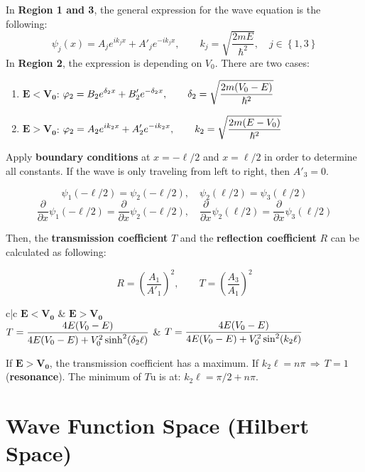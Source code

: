 \documentclass{article}
\begin{document}
\begin{twocolumn}
In \textbf{Region 1 and 3}, the general expression for the wave equation is the following:
$$\psi_j(x) = A_j e^{i k_j x} + A'_j e^{-i k_j x}, \qquad k_j = \sqrt{\frac{2mE}{\hslash^2}}, \quad j \in \left\{ 1, 3 \right\}$$
In \textbf{Region 2}, the expression is depending on $V_0$. There are two cases:
\begin{enumerate}
	\item $\mathbf{E < V_0}$: $\displaystyle \varphi_2 = B_2 e^{\delta_2 x} + B'_2 e^{- \delta_2 x}, \qquad \delta_2 = \sqrt{\frac{2m(V_0 - E)}{\hslash^2}}$
	\item $\mathbf{E > V_0}$: $\displaystyle \varphi_2 = A_2 e^{i k_2 x} + A'_2 e^{-i k_2 x}, \qquad k_2 = \sqrt{\frac{2m(E - V_0)}{\hslash^2}}$
\end{enumerate}
Apply \textbf{boundary conditions} at $x = -\ell/2$ and $x = \ell/2$ in order to determine all constants. If the wave is only traveling from left to right, then $A'_3 = 0$.

$$\psi_1(-\ell/2) = \psi_2(-\ell/2), \quad \psi_2(\ell/2) = \psi_3(\ell/2)$$
$$\frac{\partial}{\partial x}\psi_1(-\ell/2) = \frac{\partial}{\partial x}\psi_2(-\ell/2), \quad \frac{\partial}{\partial x}\psi_2(\ell/2) = \frac{\partial}{\partial x}\psi_3(\ell/2)$$

Then, the \textbf{transmission coefficient} $T$ and the \textbf{reflection coefficient} $R$ can be calculated as following:

$$R = \left(\frac{A_1}{A'_1}\right)^2, \qquad T = \left(\frac{A_3}{A_1}\right)^2$$

\begin{center}
\begin{mtabular}{c|c}
	$\mathbf{E < V_0}$ & $\mathbf{E > V_0}$ \\
	$\displaystyle T = \frac{4E (V_0 - E)}{4 E (V_0 - E) + V_0^2 \sinh^2 ( \delta_2 \ell )}$ &
	$\displaystyle T = \frac{4E (V_0 - E)}{4 E (V_0 - E) + V_0^2 \sin^2 ( k_2 \ell )}$ \\
\end{mtabular}
\end{center}

If $\mathbf{E > V_0}$, the transmission coefficient has a maximum. If $k_2 \ell = n \pi \, \Rightarrow \, T = 1$ (\textbf{resonance}). The minimum of $T$u is at: $k_2 \ell = \pi/2 + n\pi$.

\end{twocolumn}

\section{Wave Function Space (Hilbert Space)}
\end{document}
